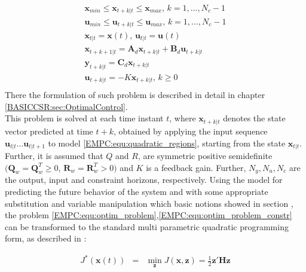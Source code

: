     \begin{equation}
        \begin{array}{l}
            \textbf{x}_{min}\leq\textbf{x}_{t+k|t}\leq\textbf{x}_{max},\,k=1,\dots,N_c-1\\
            \textbf{u}_{min}\leq\textbf{u}_{t+k|t}\leq\textbf{u}_{max},\,k=1,\dots,N_c-1\\
            \textbf{x}_{t|t}=\textbf{x}(t),\,\textbf{u}_{t|t}=\textbf{u}(t)\\
            \textbf{x}_{t+k+1|t}=\textbf{A}_d\textbf{x}_{t+k|t}+\textbf{B}_d\textbf{u}_{t+k|t}\\
            \textbf{y}_{t+k|t}=\textbf{C}_d\textbf{x}_{t+k|t}\\
            \textbf{u}_{t+k|t}=-K\textbf{x}_{t+k|t},\,k\geq0\\
        \end{array}
        \label{EMPC:equ:optim_problem_constr}
    \end{equation}
There the formulation of such problem is described in detail in chapter \ref{BASICCSR:sec:OptimalControl}.\\
    This problem is solved at each time instant $t$, where $\textbf{x}_{t+k\vert t}$ denotes the state vector predicted at time $t+k$, obtained by applying the input sequence $\textbf{u}_{t|t}...\textbf{u}_{t|t+1}$ to model \ref{EMPC:equ:quadratic_regions}, starting from the state $\textbf{x}_{t|t}$. Further, it is assumed that $Q$ and $R$, are symmetric positive semidefinite $(\textbf{Q}_w=\textbf{Q}_w^T\geq0$, $\textbf{R}_w=\textbf{R}_w^T>0)$ and $K$ is a feedback gain. Further, $N_y,N_u,N_c$ are the output, input and constraint horizons, respectively.
    Using the model for predicting the future behavior of the system and with some appropriate substitution and variable manipulation which basic notions showed in section , the problem \ref{EMPC:equ:optim_problem},\ref{EMPC:equ:optim_problem_constr} can be transformed to the standard multi parametric quadratic programming form, as described in \cite{rivera2013predictive}:

    \begin{equation}
        \begin{array}{rcl}
            J^*(\textbf{x}(t))&=&\min_{\textbf{z}}J(\textbf{x},\textbf{z})=\frac{1}{2}\textbf{z}'\textbf{H}\textbf{z}
        \end{array}
        \label{EMPC:equ:quadratic_program}
    \end{equation}

